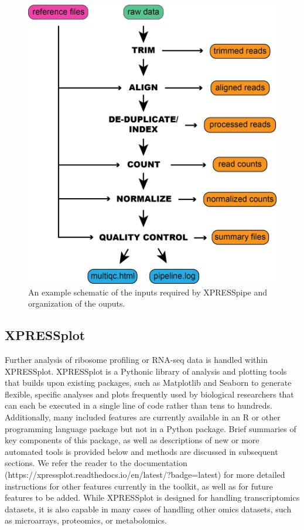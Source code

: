 \documentclass[11pt, a4paper, oneside]{article}
\begin{document}
\begin{figure}
\centering
  \includegraphics[width=120mm]{figures/xpresspipe_overview.png}
  \caption{An example schematic of the inputs required by XPRESSpipe and organization of the ouputs.}
  \label{fig:outputs}
\end{figure}


\subsection{XPRESSplot}
Further analysis of ribosome profiling or RNA-seq data is handled within XPRESSplot. XPRESSplot is a Pythonic library of analysis and plotting tools that builds upon existing packages, such as Matplotlib \cite{matplotlib} and Seaborn \cite{seaborn} to generate flexible, specific analyses and plots frequently used by biological researchers that can each be executed in a single line of code rather than tens to hundreds. Additionally, many included features are currently available in an R or other programming language package but not in a Python package. Brief summaries of key components of this package, as well as descriptions of new or more automated tools is provided below and methods are discussed in subsequent sections. We refer the reader to the documentation (https://xpressplot.readthedocs.io/en/latest/?badge=latest) for more detailed instructions for other features currently in the toolkit, as well as for future features to be added. While XPRESSplot is designed for handling transcriptomics datasets, it is also capable in many cases of handling other omics datasets, such as microarrays, proteomics, or metabolomics.
\end{document}
